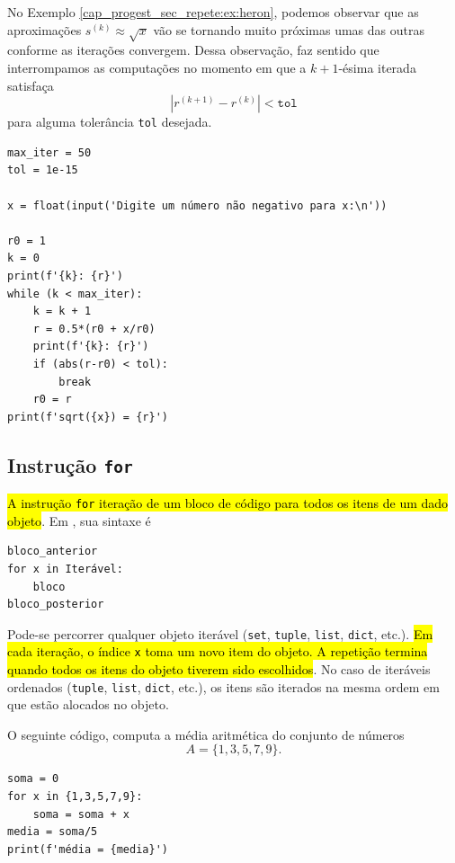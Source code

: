 \begin{ex}\label{cap_progest_sec_repete:ex:heron_break}
  No Exemplo \ref{cap_progest_sec_repete:ex:heron}, podemos observar que as aproximações $s^{(k)}\approx \sqrt{x}$ vão se tornando muito próximas umas das outras conforme as iterações convergem. Dessa observação, faz sentido que interrompamos as computações no momento em que a $k+1$-ésima iterada satisfaça
  \begin{equation}
    \left|r^{(k+1)}-r^{(k)}\right| < \texttt{tol}
  \end{equation}
  para alguma tolerância \lstinline+tol+ desejada.

\begin{lstlisting}
max_iter = 50
tol = 1e-15

x = float(input('Digite um número não negativo para x:\n'))

r0 = 1
k = 0
print(f'{k}: {r}')
while (k < max_iter):
    k = k + 1
    r = 0.5*(r0 + x/r0)
    print(f'{k}: {r}')
    if (abs(r-r0) < tol):
        break
    r0 = r
print(f'sqrt({x}) = {r}')
\end{lstlisting}

\end{ex}

\subsection{Instrução \texttt{for}}

\hl{A instrução \texttt{for} iteração de um bloco de código para todos os itens de um dado objeto}. Em {\python}, sua sintaxe é

\begin{lstlisting}
bloco_anterior
for x in Iterável:
    bloco
bloco_posterior
\end{lstlisting}

Pode-se percorrer qualquer objeto iterável (\lstinline+set+, \lstinline+tuple+, \lstinline+list+, \lstinline+dict+, etc.). \hl{Em cada iteração, o índice \texttt{x} toma um novo item do objeto. A repetição termina quando todos os itens do objeto tiverem sido escolhidos}. No caso de iteráveis ordenados (\lstinline+tuple+, \lstinline+list+, \lstinline+dict+, etc.), os itens são iterados na mesma ordem em que estão alocados no objeto.

\begin{ex}\label{cap_progest_sec_repete:ex:media_for}
  O seguinte código, computa a média aritmética do conjunto de números
  \begin{equation}
    A = \{1, 3, 5, 7, 9\}.
  \end{equation}

\begin{lstlisting}
soma = 0
for x in {1,3,5,7,9}:
    soma = soma + x
media = soma/5
print(f'média = {media}')
\end{lstlisting}

\end{ex}


